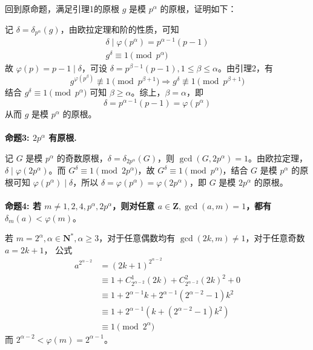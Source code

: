 \documentclass[12pt,a4paper]{article}
\begin{document}
回到原命题，满足引理1的原根 $g$ 是模 $p^\alpha$ 的原根，证明如下：

记 $\delta=\delta_{p^\alpha}(g)$，由欧拉定理和阶的性质，可知 
\begin{align*}
	\delta\mid\varphi(p^\alpha)=p^{\alpha-1}(p-1)\\ g^\delta\equiv1\pmod{p^\alpha}
\end{align*}
故 $\varphi(p)=p-1\mid \delta$，可设 $\delta=p^{\beta-1}(p-1),1\le\beta\le \alpha$。由引理2，有 \begin{equation*}
	g^{\varphi(p^{\beta})}\not\equiv 1\pmod {p^{\beta+1}}\Rightarrow g^{\delta}\not\equiv 1\pmod {p^{\beta+1}}
\end{equation*}结合 $g^\delta\equiv1\pmod{p^\alpha}$ 可知 $\beta\ge \alpha$。综上，$\beta=\alpha$，即 
\begin{equation*}
	\delta=p^{\alpha-1}(p-1)=\varphi(p^\alpha)
\end{equation*}从而 $g$ 是模 $p^\alpha$ 的原根。
\\
\\\textbf{命题3: $2p^\alpha$ 有原根.}

记 $G$ 是模 $p^\alpha$ 的奇数原根，$\delta=\delta_{2p^\alpha}(G)$，则 $\gcd(G, 2p^\alpha)=1$。由欧拉定理，$\delta\mid \varphi(2p^\alpha)$。而 $G^\delta\equiv1\pmod{2p^\alpha}$，故 $G^\delta\equiv1\pmod{p^\alpha}$，结合 $G$ 是模 $p^\alpha$ 的原根可知 $\varphi(p^\alpha)\mid \delta$，所以 $\delta=\varphi(p^\alpha)=\varphi(2p^\alpha)$，即 $G$ 是模 $2p^\alpha$ 的原根。
\\
\\\textbf{命题4: 若 $m\neq 1,2,4,p^\alpha,2p^\alpha$，则对任意 $a\in\mathbf{Z},\gcd(a,m)=1$，都有 $\delta_m(a)<\varphi(m)$}。

若 $m=2^\alpha,\alpha\in\mathbf{N^*},\alpha\ge3$，对于任意偶数均有 $\gcd(2k,m)\ne1$，对于任意奇数 $a=2k+1$，
公式
\begin{align*}
	a^{2^{\alpha-2}}
	&=(2k+1)^{2^{\alpha-2}}\\
	&\equiv1+C_{2^{\alpha-2}}^1(2k)+C_{2^{\alpha-2}}^{2}(2k)^2+0\\
	&\equiv1+2^{\alpha-1}k+2^{\alpha-1}(2^{\alpha-2}-1)k^2\\
	&\equiv 1+2^{\alpha-1}(k+(2^{\alpha-2}-1)k^2)\\
	&\equiv 1 \pmod {2^{\alpha}}
\end{align*}
而 $2^{\alpha-2}<\varphi(m)=2^{\alpha-1}$。
\end{document}
